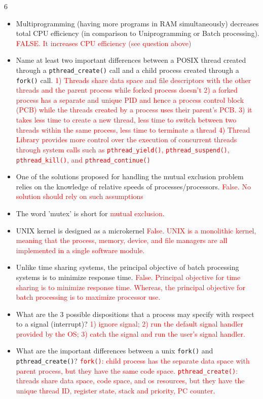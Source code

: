 \documentclass[9pt,landscape]{memoir}
\newcommand{\answer}[1]{\textcolor{red}{#1}}
\begin{document}
\begin{multicols}{6}
\begin{itemize}
    \item Multiprogramming (having more programs in RAM simultaneously) decreases total CPU efficiency (in comparison to Uniprogramming or Batch processing). \answer{FALSE. It increases CPU efficiency (see question above)}
    \item Name at least two important differences between a POSIX thread created through a \verb$pthread_create()$ call and a child process created through a \verb$fork()$ call.  \answer{1) Threads share data space and file descriptors with the other threads and the parent process while forked process doesn't 2) a forked process has a separate and unique PID and hence a process control block (PCB) while the threads created by a process uses their parent's PCB. 3) it takes less time to create a new thread, less time to switch between two threads within the same process, less time to terminate a thread 4) Thread Library provides more control over the execution of concurrent threads through system calls such as \texttt{pthread\_yield()}, \texttt{pthread\_suspend()}, \texttt{pthread\_kill()}, and \texttt{pthread\_continue()}}
    \item One of the solutions proposed for handling the mutual exclusion problem relies on the knowledge of relative speeds of processes/processors. \answer{False. No solution should rely on such assumptions}
    \item The word 'mutex' is short for \answer{mutual exclusion}.
    \item UNIX kernel is designed as a microkernel \answer{False. UNIX is a monolithic kernel, meaning that the process, memory, device, and file managers are all implemented in a single software module.}
    \item Unlike time sharing systems, the principal objective of batch processing systems is to minimize response time. \answer{False. Principal objective for time sharing is to minimize response time. Whereas, the principal objective for batch processing is to maximize processor use.}
    \item What are the 3 possible dispositions that a process may specify with respect to a signal (interrupt)? \answer{1) ignore signal; 2) run the default signal handler provided by the OS; 3) catch the signal and run the user's signal handler.}
    \item What are the important differences between a unix \verb$fork()$ and \verb$pthread_create()$? \answer{\texttt{fork()}: child process has the separate data space with parent process, but they have the same code space. \texttt{pthread\_create()}: threads share data space, code space, and os resources, but they have the unique thread ID, register state, stack and priority, PC counter.}

\end{itemize}
\end{multicols}
\end{document}
